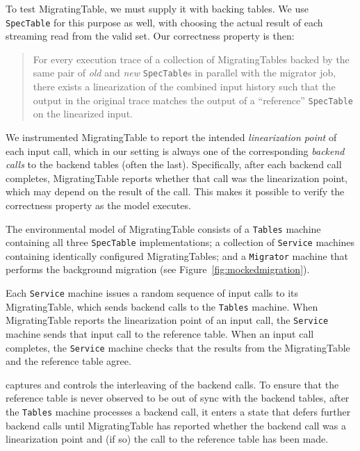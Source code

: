 
To test MigratingTable, we must supply it with backing tables.  We use \texttt{SpecTable} for this purpose as well, with \psharp choosing the actual result of each streaming read from the valid set.  Our correctness property is then:
\begin{quote}
For every execution trace of a collection of MigratingTables backed by the same pair of \emph{old} and \emph{new} \texttt{SpecTable}s in parallel with the migrator job, there exists a linearization of the combined input history such that the output in the original trace matches the output of a ``reference'' \texttt{SpecTable} on the linearized input.
\end{quote}
%
We instrumented MigratingTable to report the intended \emph{linearization point} of each input call, which in our setting is always one of the corresponding \emph{backend calls} to the backend tables (often the last).  Specifically, after each backend call completes, MigratingTable reports whether that call was the linearization point, which may depend on the result of the call.  This makes it possible to verify the correctness property as the model executes.

The \psharp environmental model of MigratingTable consists of a \psharp \texttt{Tables} machine containing all three \texttt{SpecTable} implementations; a collection of \texttt{Service} machines containing identically configured MigratingTables; and a \texttt{Migrator} machine that performs the background migration (see Figure~\ref{fig:mockedmigration}).

Each \texttt{Service} machine issues a random sequence of input calls to its MigratingTable, which sends backend calls to the \texttt{Tables} machine. When MigratingTable reports the linearization point of an input call, the \texttt{Service} machine sends that input call to the reference table.  When an input call completes, the \texttt{Service} machine checks that the results from the MigratingTable and the reference table agree.

\psharp captures and controls the interleaving of the backend calls. To ensure that the reference table is never observed to be out of sync with the backend tables, after the \texttt{Tables} machine processes a backend call, it enters a state that defers further backend calls until MigratingTable has reported whether the backend call was a linearization point and (if so) the call to the reference table has been made.

